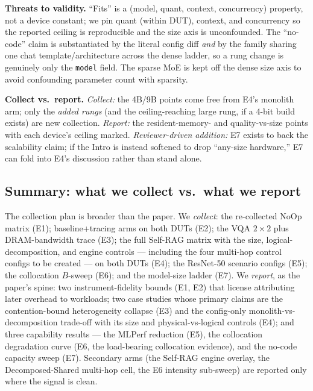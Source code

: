 \textbf{Threats to validity.} ``Fits'' is a (model, quant, context,
concurrency) property, not a device constant; we pin quant (within DUT),
context, and concurrency so the reported ceiling is reproducible and the
size axis is unconfounded. The ``no-code'' claim is substantiated by the
literal config diff \emph{and} by the family sharing one chat
template/architecture across the dense ladder, so a rung change is
genuinely only the \texttt{model} field. The sparse MoE is kept off the
dense size axis to avoid confounding parameter count with sparsity.

\textbf{Collect vs.\ report.} \emph{Collect:} the 4B/9B points come free
from E4's monolith arm; only the \emph{added rungs} (and the
ceiling-reaching large rung, if a 4-bit build exists) are new collection.
\emph{Report:} the resident-memory- and quality-vs-size points with each
device's ceiling marked. \emph{Reviewer-driven addition:} E7 exists to
back the scalability claim; if the Intro is instead softened to drop
``any-size hardware,'' E7 can fold into E4's discussion rather than stand
alone.

\subsection{Summary: what we collect vs.\ what we report}
\label{sec:setup-summary}

The collection plan is broader than the paper. We \emph{collect}: the
re-collected NoOp matrix (E1); baseline+tracing arms on both DUTs (E2); the
VQA $2\times2$ plus DRAM-bandwidth trace (E3); the full Self-RAG matrix
with the size, logical-decomposition, and engine controls --- including the
four multi-hop control configs to be created --- on both DUTs (E4); the
ResNet-50 scenario configs (E5); the collocation $B$-sweep (E6); and the
model-size ladder (E7). We \emph{report}, as the paper's spine: two
instrument-fidelity bounds (E1, E2) that license attributing later
overhead to workloads; two case studies whose primary claims are the
contention-bound heterogeneity collapse (E3) and the config-only
monolith-vs-decomposition trade-off with its size and physical-vs-logical
controls (E4); and three capability results --- the MLPerf reduction (E5),
the collocation degradation curve (E6, the load-bearing collocation
evidence), and the no-code capacity sweep (E7). Secondary arms (the
Self-RAG engine overlay, the Decomposed-Shared multi-hop cell, the E6
intensity sub-sweep) are reported only where the signal is clean.

